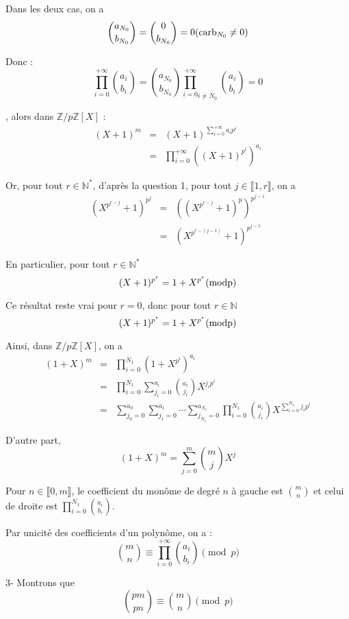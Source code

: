 Dans les deux cas, on a
\[ \binom{a_{N_0}}{b_{N_0}} = \binom{0}{b_{N_0}} = 0 (\operatorname{carb}_{N_0} \neq
   0) \]


Donc :
\[ \prod_{i = 0}^{+ \infty} \binom{a_i}{b_i} = \binom{a_{N_0}}{b_{N_0}}
   {\prod_{i = 0}^{+ \infty}}_{i \neq N_0} \binom{a_i}{b_i} = 0 \]


, alors dans $\mathbb{Z}/ p\mathbb{Z}[X]$ :
\begin{eqnarray*}
  (X + 1)^m & = & (X + 1)^{\sum_{i = 0}^{+ \infty} a_i p^i}\\
  & = & \prod^{+ \infty}_{i = 0} ((X + 1)^{p^i})^{a_i}
\end{eqnarray*}


Or, pour tout $r \in \mathbb{N}^{\ast}$, d'apr{\`e}s la question 1, pour tout
$j \in \llbracket 1, r \rrbracket$, on a
\begin{eqnarray*}
  (X^{p^{r - j}} + 1)^{p^j} & = & ((X^{p^{r - j}} + 1)^p)^{p^{j - 1}}\\
  & = & (X^{p^{r - (j - 1)}} + 1)^{p^{j - 1}}
\end{eqnarray*}


En particulier, pour tout $r \in \mathbb{N}^{\ast}$
\[ (X + 1)^{p^r} = 1 + X^{p^r} (\operatorname{modp}) \]


Ce r{\'e}sultat reste vrai pour $r = 0$, donc pour tout $r \in \mathbb{N}$
\[ (X + 1)^{p^r} = 1 + X^{p^r} (\operatorname{modp}) \]


Ainsi, dans $\mathbb{Z}/ p\mathbb{Z}[X]$, on a
\begin{eqnarray*}
  (1 + X)^m & = & \prod_{i = 0}^{N_1} (1 + X^{p^i})^{a_i}\\
  & = & \prod_{i = 0}^{N_1} \sum_{j_i = 0}^{a_i} \binom{a_i}{j_i} X^{j_i
  p^i}\\
  & = & \sum_{j_0 = 0}^{a_0} \sum_{j_1 = 0}^{a_1} \cdots \sum_{j_{N_1} =
  0}^{a_{N_1}} \prod_{i = 0}^{N_1} \binom{a_i}{j_i} X^{\sum_{i = 0}^{N_1} j_i
  p^i}
\end{eqnarray*}


D'autre part,
\[ (1 + X)^m = \sum_{j = 0}^m \binom{m}{j} X^j \]


Pour $n \in \llbracket 0, m \rrbracket$, le coefficient du mon{\^o}me de
degr{\'e} $n$ {\`a} gauche est $\binom{m}{n}$ et celui de droite est $\prod_{i
= 0}^{N_1} \binom{a_i}{b_i}$.

Par unicit{\'e} des coefficients d'un polyn{\^o}me, on a :
\[ \  \]
\[ \binom{m}{n} \equiv \prod_{i = 0}^{+ \infty} \binom{a_i}{b_i} \pmod{p} \]


3- Montrons que
\[ \binom{pm}{pn} \equiv \binom{m}{n} \pmod{p} \]


